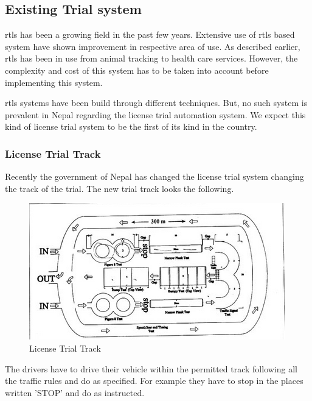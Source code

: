 \subsection{Existing Trial system}
		\gls{rtls} has been a growing field in the past few years. Extensive use of \gls{rtls} based system have shown improvement in respective area of use. As described earlier, \gls{rtls} has been in use from animal tracking to health care services. However, the complexity and cost of this system has to be taken into account before implementing this system.

		\gls{rtls} systems have been build through different techniques. But, no such system is prevalent in Nepal regarding the license trial automation system. We expect this kind of license trial system to be the first of its kind in the country.

	\subsubsection{License Trial Track}
		Recently the government of Nepal has changed the license trial system changing the track of the trial. The new trial track looks the following.
			\begin{figure}[htpb]
				\centering
				\includegraphics[scale=.8]{Images/TrialTrack.png}
				\caption{License Trial Track}
				\label{fig:LicenceTrialTrack}
			\end{figure}
		The drivers have to drive their vehicle within the permitted track following all the traffic rules and do as specified. For example they have to stop in the places written 'STOP' and do as instructed.
		
